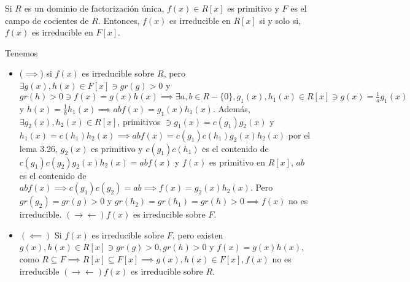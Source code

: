 \begin{lema}[3.27]
    Si $R$ es un dominio de factorización única, $f(x)\in R[x]$ es primitivo y $F$ es el campo de cocientes de $R$. Entonces, $f(x)$ es irreducible en $R[x]$ si y solo si, $f(x)$ es irreducible en $F[x]$.
    \begin{dem}
        Tenemos 
        \begin{itemize}
            \item ($\implies$) si $f(x)$ es irreducible sobre $R$, pero $\exists g(x),h(x)\in F[x]\ni gr(g)>0$ y $gr(h)>0\ni f(x)=g(x)h(x)\implies \exists a,b\in R-\{0\},g_1(x),h_1(x)\in R[x]\ni g(x)=\frac{1}{a}g_1(x)$ y $h(x)=\frac{1}{b}h_1(x)\implies abf(x)=g_1(x)h_1(x)$. Además, $\exists g_2(x),h_2(x)\in R[x]$, primitivos $\ni g_1(x)=c(g_1)g_2(x)$ y $h_1(x)=c(h_1)h_2(x)\implies abf(x)=c(g_1)c(h_1)g_2(x)h_2(x)$ por el lema 3.26, $g_2(x)$ es primitivo y $c(g_1)c(h_1)$ es el contenido de $c(g_1)c(g_2)g_2(x)h_2(x)=abf(x)$ y $f(x)$ es primitivo en $R[x]$, $ab$ es el contenido de $abf(x)\implies c(g_1)c(g_2)=ab\implies f(x)=g_2(x)h_2(x)$. Pero $gr(g_2)=gr(g)>0$ y $gr(h_2)=gr(h_1)=gr(h)>0\implies f(x)$ no es irreducible. $(\to\gets) f(x)$ es irreducible sobre $F$.
            \item $(\impliedby)$ Si $f(x)$ es irreducible sobre $F$, pero existen $g(x),h(x)\in R[x]\ni gr(g)>0,gr(h)>0$ y $f(x)=g(x)h(x)$, como $R\subseteq F\implies R[x]\subseteq F[x]\implies g(x),h(x)\in F[x], f(x)$ no es irreducible $(\to\gets) f(x)$ es irreducible sobre $R$. 
        \end{itemize}
    \end{dem}
\end{lema}